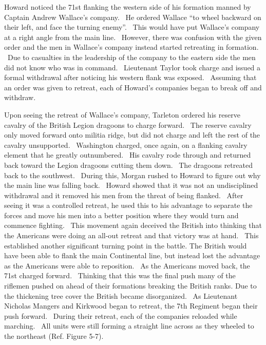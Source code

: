Howard noticed the 71st flanking the western side of his formation manned by
Captain Andrew Wallace’s company.  He ordered Wallace “to wheel backward on
their left, and face the turning enemy”. \cite[p.109]{babits_devil_2001}  This would have put
Wallace’s company at a right angle from the main line.  However, there was
confusion with the given order and the men in Wallace’s company instead started
retreating in formation.  Due to casualties in the leadership of the company to
the eastern side the men did not know who was in command.  Lieutenant Taylor
took charge and issued a formal withdrawal after noticing his western flank was
exposed.  Assuming that an order was given to retreat, each of Howard’s
companies began to break off and withdraw.  

Upon seeing the retreat of Wallace’s company, Tarleton ordered his reserve
cavalry of the British Legion dragoons to charge forward.  The reserve cavalry
only moved forward onto militia ridge, but did not charge and left the rest of
the cavalry unsupported.  Washington charged, once again, on a flanking cavalry
element that he greatly outnumbered.  His cavalry rode through and returned back
toward the Legion dragoons cutting them down.  The dragoons retreated back to
the southwest.  During this, Morgan rushed to Howard to figure out why the main
line was falling back.  Howard showed that it was not an undisciplined
withdrawal and it removed his men from the threat of being flanked.  After
seeing it was a controlled retreat, he used this to his advantage to separate
the forces and move his men into a better position where they would turn and
commence fighting.  This movement again deceived the British into thinking that
the Americans were doing an all-out retreat and that victory was at hand.  This
established another significant turning point in the battle.  The British would
have been able to flank the main Continental line, but instead lost the
advantage as the Americans were able to reposition.  As the Americans moved
back, the 71st charged forward.  Thinking that this was the final push many of
the riflemen pushed on ahead of their formations breaking the British ranks.
Due to the thickening tree cover the British became disorganized.  As Lieutenant
Nicholas Mangers and Kirkwood began to retreat, the 7th Regiment began their
push forward.  During their retreat, each of the companies reloaded while
marching.  All units were still forming a straight line across as they wheeled
to the northeast (Ref. Figure 5-7).



